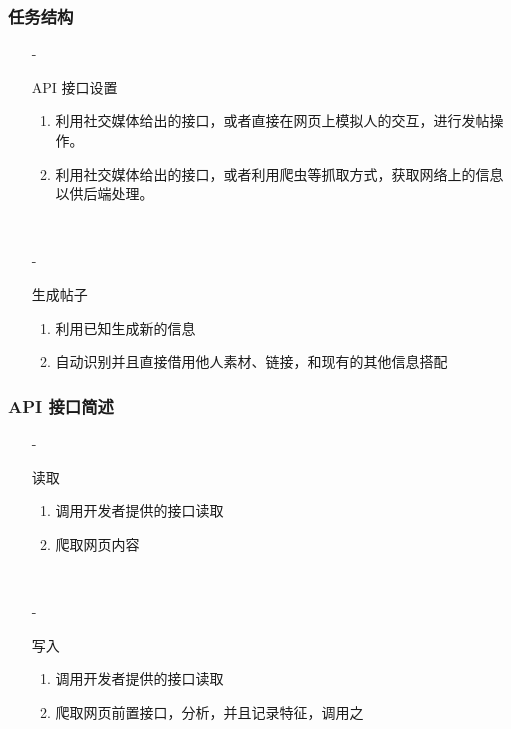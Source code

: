 \documentclass[../Postbot.tex]{subfiles}
\begin{document}
    
    \begin{frame}
        \frametitle{任务结构}
        \begin{itemize}
            \item[-]{
                API 接口设置
                \begin{enumerate}
                    \item 利用社交媒体给出的接口，或者直接在网页上模拟人的交互，进行发帖操作。
                    \item 利用社交媒体给出的接口，或者利用爬虫等抓取方式，获取网络上的信息以供后端处理。
                \end{enumerate}
                \hspace*{\fill}\\
                }
            \item[-]{
                生成帖子
                \begin{enumerate}
                    \item 利用已知生成新的信息
                    \item 自动识别并且直接借用他人素材、链接，和现有的其他信息搭配
                \end{enumerate}
                } 
        \end{itemize}
    \end{frame}


    \begin{frame}
        \frametitle{API 接口简述}
        \begin{itemize}
            \item[-]{
                读取
                \begin{enumerate}
                    \item 调用开发者提供的接口读取
                    \item 爬取网页内容
                \end{enumerate}
                \hspace*{\fill}\\
                }
            \item[-]{
                写入
                \begin{enumerate}
                    \item 调用开发者提供的接口读取
                    \item 爬取网页前置接口，分析，并且记录特征，调用之
                \end{enumerate}
                } 
        \end{itemize}
    \end{frame}
\end{document}
